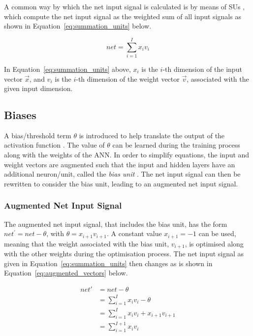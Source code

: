 A common way by which the net input signal is calculated is by means of \acp{SU} \cite{ref:engelbrecht:2007}, which compute the net input signal as the weighted sum of all input signals as shown in Equation~\eqref{eq:summation_units} below.

\begin{equation}
    net = \sum_{i=1}^{I}{x_{i}v_{i}}
    \label{eq:summation_units}
\end{equation}

\noindent
In Equation~\eqref{eq:summation_units} above, $x_{i}$ is the $i$-th dimension of the input vector $\vec{x}$, and $v_{i}$ is the $i$-th dimension of the weight vector $\vec{v}$, associated with the given input dimension.


\subsection{Biases}\label{sec:anns:an:biases}

A bias/threshold term $\theta$ is introduced to help translate the output of the activation function \cite{ref:benitez:1997}. The value of $\theta$ can be learned during the training process along with the weights of the \acs{ANN}. In order to simplify equations, the input and weight vectors are augmented such that the input and hidden layers have an additional neuron/unit, called the \textit{bias unit} \cite{ref:engelbrecht:2007}. The net input signal can then be rewritten to consider the bias unit, leading to an augmented net input signal.


\subsubsection{Augmented Net Input Signal}\label{sec:anns:an:biases:augmented_net_input_signal}

The augmented net input signal, that includes the bias unit, has the form $net^{'} = net - \theta$, with $\theta = x_{i+1}v_{i+1}$. A constant value $x_{i+1} = -1$ can be used, meaning that the weight associated with the bias unit, $v_{i+1}$, is optimised along with the other weights during the optimisation process. The net input signal as given in Equation~\eqref{eq:summation_units} then changes as is shown in Equation~\eqref{eq:augmented_vectors} below.

\begin{equation}
    \begin{split}
        net{'} & = net - \theta \\
        & = \sum_{i=1}^{I} x_i v_i - \theta\\
        & = \sum_{i=1}^{I} x_i v_i + x_{i+1} v_{i+1} \\
        & = \sum_{i=1}^{I+1} x_i v_i
        \label{eq:augmented_vectors}
    \end{split}
\end{equation}


